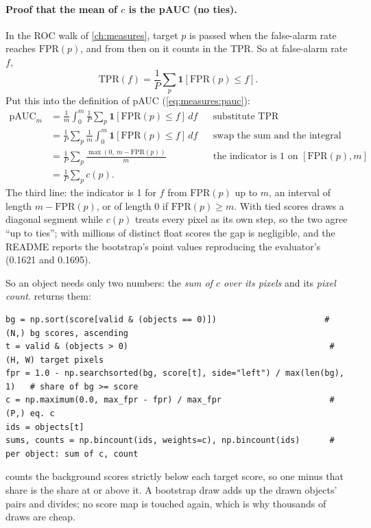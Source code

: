 \paragraph{Proof that the mean of $c$ is the pAUC (no ties).} In the ROC walk of \cref{ch:measures}, target $p$ is
passed when the false-alarm rate reaches $\mathrm{FPR}(p)$, and from then on it counts in the TPR. So at false-alarm
rate $f$,
\[
\mathrm{TPR}(f) = \frac1P \sum_p \mathbf{1}[\mathrm{FPR}(p) \le f].
\]
Put this into the definition of pAUC (\cref{eq:measures:pauc}):
\begin{align*}
\mathrm{pAUC}_m &= \frac1m \int_0^m \frac1P \sum_p \mathbf{1}[\mathrm{FPR}(p) \le f]\,df && \text{substitute TPR}\\
&= \frac1P \sum_p \frac1m \int_0^m \mathbf{1}[\mathrm{FPR}(p) \le f]\,df && \text{swap the sum and the integral}\\
&= \frac1P \sum_p \frac{\max(0,\ m - \mathrm{FPR}(p))}{m} && \text{the indicator is 1 on } [\mathrm{FPR}(p), m]\\
&= \frac1P \sum_p c(p).
\end{align*}
The third line: the indicator is 1 for $f$ from $\mathrm{FPR}(p)$ up to $m$, an interval of length
$m - \mathrm{FPR}(p)$, or of length 0 if $\mathrm{FPR}(p) \ge m$. With tied scores  draws a diagonal
segment while $c(p)$ treats every pixel as its own step, so the two agree ``up to ties''; with millions of distinct float
scores the gap is negligible, and the README reports the bootstrap's point values reproducing the evaluator's (0.1621 and
0.1695).

So an object needs only two numbers: the \emph{sum of $c$ over its pixels} and its \emph{pixel count}.
 returns them:
\begin{lstlisting}[basicstyle=\ttfamily\footnotesize]
bg = np.sort(score[valid & (objects == 0)])                      # (N,) bg scores, ascending
t = valid & (objects > 0)                                         # (H, W) target pixels
fpr = 1.0 - np.searchsorted(bg, score[t], side="left") / max(len(bg), 1)   # share of bg >= score
c = np.maximum(0.0, max_fpr - fpr) / max_fpr                      # (P,) eq. c
ids = objects[t]
sums, counts = np.bincount(ids, weights=c), np.bincount(ids)      # per object: sum of c, count
\end{lstlisting}
 counts the background scores strictly below each target score, so one minus that
share is the share at or above it. A bootstrap draw adds up the drawn objects' pairs and divides; no score map is touched
again, which is why thousands of draws are cheap.

